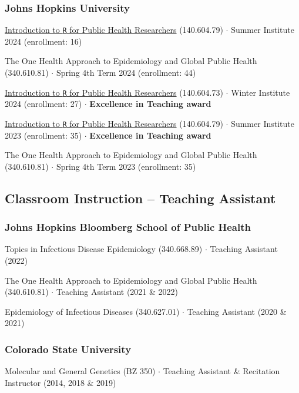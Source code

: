 \documentclass{cv}
\begin{document}
\subsubsection*{Johns Hopkins University}

\href{https://jhudatascience.org/intro_to_r/}{Introduction to \texttt{R} for Public Health Researchers} (140.604.79) $\cdot$ Summer Institute 2024 (enrollment: 16)

The One Health Approach to Epidemiology and Global Public Health (340.610.81) $\cdot$ Spring 4th Term 2024 (enrollment: 44)

\href{https://jhudatascience.org/intro_to_r/}{Introduction to \texttt{R} for Public Health Researchers} (140.604.73) $\cdot$ Winter Institute 2024 (enrollment: 27) $\cdot$ \textbf{Excellence in Teaching award}

\href{https://jhudatascience.org/intro_to_r/}{Introduction to \texttt{R} for Public Health Researchers} (140.604.79) $\cdot$ Summer Institute 2023 (enrollment: 35) $\cdot$ \textbf{Excellence in Teaching award}

The One Health Approach to Epidemiology and Global Public Health (340.610.81) $\cdot$ Spring 4th Term 2023 (enrollment: 35)

\subsection*{Classroom Instruction -- Teaching Assistant}

\subsubsection*{Johns Hopkins Bloomberg School of Public Health}

Topics in Infectious Disease Epidemiology (340.668.89) $\cdot$ Teaching Assistant (2022)

The One Health Approach to Epidemiology and Global Public Health (340.610.81) $\cdot$ Teaching Assistant (2021 \& 2022)

Epidemiology of Infectious Diseases (340.627.01) $\cdot$ Teaching Assistant (2020 \& 2021)

\subsubsection*{Colorado State University}

Molecular and General Genetics (BZ 350) $\cdot$ Teaching Assistant \& Recitation Instructor (2014, 2018 \& 2019)
\end{document}
